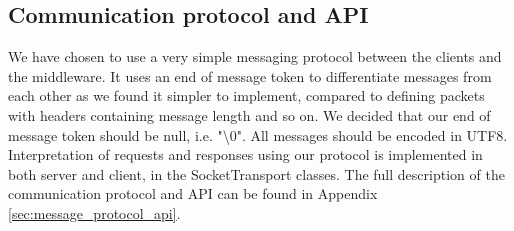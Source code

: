 \documentclass{article}
\begin{document}
        \subsection{Communication protocol and API}
            We have chosen to use a very simple messaging protocol between the clients and the middleware. It uses an end of message token to differentiate messages from each other as we found it simpler to implement, compared to defining packets with headers containing message length and so on. We decided that our end of message token should be null, i.e. "\textbackslash0". All messages should be encoded in UTF8.\\
            Interpretation of requests and responses using our protocol is implemented in both server and client, in the SocketTransport classes. The full description of the communication protocol and API can be found in Appendix \ref{sec:message_protocol_api}.
\end{document}
